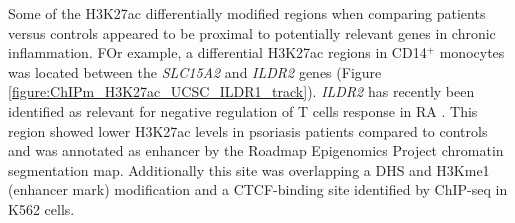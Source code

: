 Some of the H3K27ac differentially modified regions when comparing patients versus controls appeared to be proximal to potentially relevant genes in chronic inflammation. FOr example, a differential H3K27ac regions in CD14$^+$ monocytes was located between the \textit{SLC15A2} and \textit{ILDR2} genes (Figure \ref{figure:ChIPm_H3K27ac_UCSC_ILDR1_track}). \textit{ILDR2} has recently been identified as relevant for negative regulation of T cells response in RA \parencite{Hecht2018}. This region showed lower H3K27ac levels in psoriasis patients compared to controls and was annotated as enhancer by the Roadmap Epigenomics Project chromatin segmentation map. Additionally this site was overlapping a DHS and H3Kme1 (enhancer mark) modification and a CTCF-binding site identified by ChIP-seq in K562 cells. %





